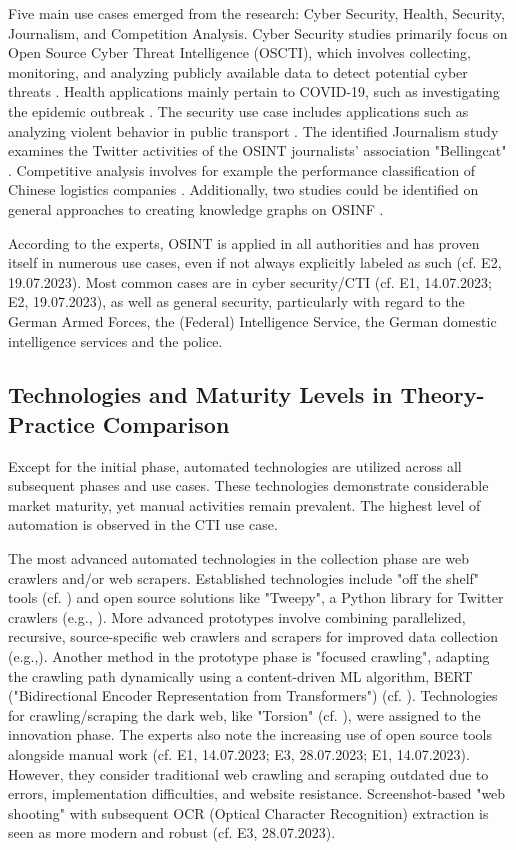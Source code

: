 \documentclass[10pt]{article}
\begin{document}
Five main use cases emerged from the research: Cyber Security, Health, Security, Journalism,
and Competition Analysis. Cyber Security studies primarily focus on Open Source Cyber Threat
Intelligence (OSCTI), which involves collecting, monitoring, and analyzing publicly available
data to detect potential cyber threats \cite{Ahuja.2022,AlDmour.2023}.
Health applications mainly pertain to COVID-19, such as investigating the epidemic outbreak \cite{Kpozehouen.2020}.
The security use case includes applications such as
analyzing violent behavior in public transport \cite{Nobili.2021}. The identified Journalism study examines the
Twitter activities of the OSINT journalists' association "Bellingcat" \cite{Bar.2023}. Competitive analysis
involves for example the performance classification of Chinese logistics companies \cite{Tao.2023}. Additionally, two
studies could be identified on general approaches to creating knowledge graphs on OSINF \cite{Hu.2023,Ma.2022}.

According to the experts, OSINT is applied in all authorities and has proven itself
in numerous use cases, even if not always explicitly labeled as such (cf. E2, 19.07.2023).
Most common cases are in cyber security/CTI (cf. E1, 14.07.2023; E2, 19.07.2023), as well as general security,
particularly with regard to the German Armed Forces, the (Federal) Intelligence Service,
the German domestic intelligence services and the police.

\subsection{Technologies and Maturity Levels in Theory-Practice Comparison}

Except for the initial phase, automated technologies are utilized across all subsequent phases and use cases.
These technologies demonstrate considerable market maturity, yet manual activities remain prevalent.
The highest level of automation is observed in the CTI use case.

The most advanced automated technologies in the collection phase are web crawlers and/or web scrapers.
Established technologies include "off the shelf" tools (cf. \cite{Middleton.2020}) and open source
solutions like "Tweepy", a Python library for Twitter crawlers (e.g., \cite{Adewopo.2020}).
More advanced prototypes involve combining parallelized, recursive, source-specific web crawlers and scrapers for improved
data collection (e.g.,\cite{Jenkins.2021}). Another method in the prototype phase is
"focused crawling", adapting the crawling path dynamically using a content-driven ML algorithm, BERT ("Bidirectional Encoder Representation from Transformers")
(cf. \cite{Kuehn.2023}). Technologies for crawling/scraping the dark web, like "Torsion" (cf. \cite{Sonawane.2022}),
were assigned to the innovation phase. The experts also note the increasing use of open source tools alongside manual work
(cf. E1, 14.07.2023; E3, 28.07.2023; E1, 14.07.2023). However, they consider traditional web crawling and scraping
outdated due to errors, implementation difficulties, and website resistance. Screenshot-based "web shooting" with
subsequent OCR (Optical Character Recognition) extraction is seen as more modern and robust (cf. E3, 28.07.2023).
\end{document}
